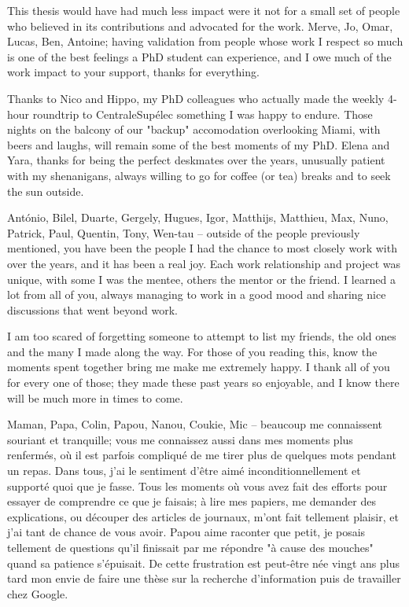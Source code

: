 This thesis would have had much less impact were it not for a small set of people who believed in its contributions and advocated for the work. Merve, Jo, Omar, Lucas, Ben, Antoine; having validation from people whose work I respect so much is one of the best feelings a PhD student can experience, and I owe much of the work impact to your support, thanks for everything.


Thanks to Nico and Hippo, my PhD colleagues who actually made the weekly 4-hour roundtrip to CentraleSupélec something I was happy to endure. Those nights on the balcony of our "backup" accomodation overlooking Miami, with beers and laughs, will remain some of the best moments of my PhD. Elena and Yara, thanks for being the perfect deskmates over the years, unusually patient with my shenanigans, always willing to go for coffee (or tea) breaks and to seek the sun outside.

António, Bilel, Duarte, Gergely, Hugues, Igor, Matthijs, Matthieu, Max, Nuno, Patrick, Paul, Quentin, Tony, Wen-tau -- outside of the people previously mentioned, you have been the people I had the chance to most closely work with over the years, and it has been a real joy. Each work relationship and project was unique, with some I was the mentee, others the mentor or the friend. I learned a lot from all of you, always managing to work in a good mood and sharing nice discussions that went beyond work.


I am too scared of forgetting someone to attempt to list my friends, the old ones and the many I made along the way. For those of you reading this, know the moments spent together bring me make me extremely happy. I thank all of you for every one of those; they made these past years so enjoyable, and I know there will be much more in times to come.

Maman, Papa, Colin, Papou, Nanou, Coukie, Mic -- beaucoup me connaissent souriant et tranquille; vous me connaissez aussi dans mes moments plus renfermés, où il est parfois compliqué de me tirer plus de quelques mots pendant un repas. Dans tous, j'ai le sentiment d'être aimé inconditionnellement et supporté quoi que je fasse. Tous les moments où vous avez fait des efforts pour essayer de comprendre ce que je faisais; à lire mes papiers, me demander des explications, ou découper des articles de journaux, m'ont fait tellement plaisir, et j'ai tant de chance de vous avoir. Papou aime raconter que petit, je posais tellement de questions qu'il finissait par me répondre "à cause des mouches" quand sa patience s'épuisait. De cette frustration est peut-être née vingt ans plus tard mon envie de faire une thèse sur la recherche d'information puis de travailler chez Google.

